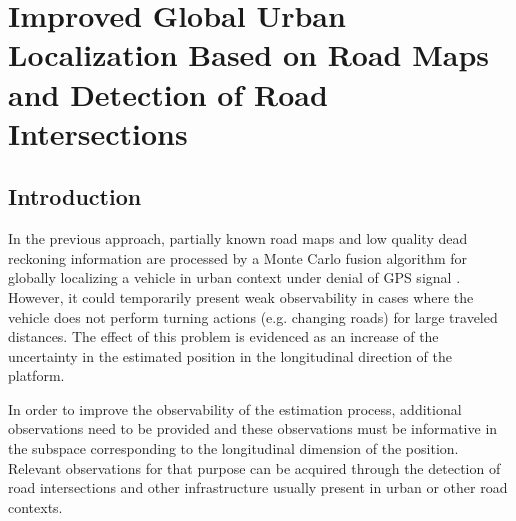 \chapter{Improved Global Urban Localization Based on Road Maps and Detection of Road Intersections}

\section{Introduction}

In the previous approach, partially known road maps and low quality dead reckoning information are processed by a Monte Carlo fusion algorithm for globally localizing a vehicle in urban context under denial of GPS signal \cite{guivant2007global}. However, it could temporarily present weak observability in cases where the vehicle does not perform turning actions (e.g. changing roads) for large traveled distances. The effect of this problem is evidenced as an increase of the uncertainty in the estimated position in the longitudinal direction of the platform.

In order to improve the observability of the estimation process, additional observations need to be provided and these observations must be informative in the subspace corresponding to the longitudinal dimension of the position. Relevant observations for that purpose can be acquired through the detection of road intersections and other infrastructure usually present in urban or other road contexts.

